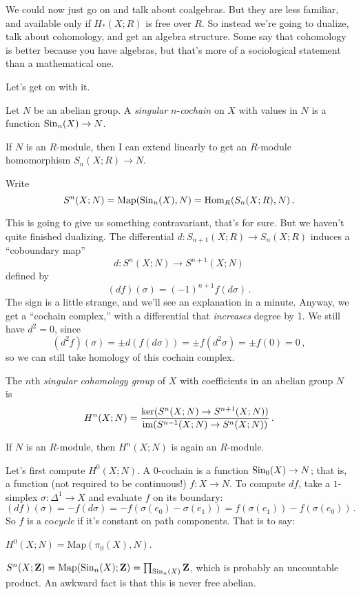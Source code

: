 We could now just go on and talk about coalgebras. But they are less familiar,
and available only if $H_\ast(X;R)$ is free over $R$. 
So instead we're going to dualize,
talk about cohomology, and get an algebra structure. Some say that cohomology is better because you have algebras, but that's more of a sociological statement than a mathematical one.

Let's get on with it.
\begin{definition}
Let $N$ be an abelian group. A {\em singular} $n$-{\em cochain} on $X$ with values in $N$ is a function $\mathrm{Sin}_n(X)\to N$. 
\end{definition}
If $N$ is an $R$-module, then I can extend linearly to get an $R$-module homomorphism $S_n(X;R)\to N$.
\begin{notation}
Write 
\[
S^n(X;N)=\operatorname{Map}(\mathrm{Sin}_n(X),N)=\operatorname{Hom}_R(S_n(X;R),N)\,.
\]
\end{notation}
This is going to give us something contravariant, that's for sure. But we 
haven't quite finished dualizing. The differential 
$d:S_{n+1}(X;R)\to S_n(X;R)$ 
induces a ``coboundary map'' 
\[
d:S^n(X;N)\to S^{n+1}(X;N)
\]
defined by
\[
(df)(\sigma)=(-1)^{n+1}f(d\sigma)\,.
\]
The sign is a little strange, and we'll see an explanation in a minute.
Anyway, we get a ``cochain complex,'' with a differential that {\em increases}
degree by 1. We still have $d^2=0$, since
\[
(d^2f)(\sigma)=\pm d(f(d\sigma))=\pm f(d^2\sigma)=\pm f(0)=0\,,
\]
so we can still take homology of this cochain complex. 
\begin{definition}
The $n$th {\em singular cohomology group} of $X$ with coefficients in an abelian group $N$ is 
\[
H^n(X;N)=
\frac{\ker(S^n(X;N)\to S^{n+1}(X;N))}{\operatorname{im}(S^{n-1}(X;N)\to S^n(X;N))}\,.
\]
\end{definition}

If $N$ is an $R$-module, then $H^n(X;N)$ is again an $R$-module.

Let's first compute $H^0(X;N)$. A $0$-cochain is a function $\mathrm{Sin}_0(X)\to N$;
that is, a function (not required to be continuous!) $f:X\to N$. To compute 
$df$, take a $1$-simplex $\sigma:\Delta^1\to X$ and evaluate $f$ 
on its boundary:
\[
(df)(\sigma)=-f(d\sigma)=-f(\sigma(e_0)-\sigma(e_1))=
f(\sigma(e_1))-f(\sigma(e_0))\,.
\]
So $f$ is a co{\em cycle} if it's constant on path components. That is to say:
\begin{lemma}
$H^0(X;N)=\mathrm{Map}(\pi_0(X),N)$.
\end{lemma}
\begin{warning}
$S^n(X;\mathbf Z)=\operatorname{Map}(\mathrm{Sin}_n(X);\mathbf Z)=\prod_{\mathrm{Sin}_n(X)}\mathbf Z$, which is probably an uncountable product. An awkward fact is that this is never free abelian.
\end{warning}

